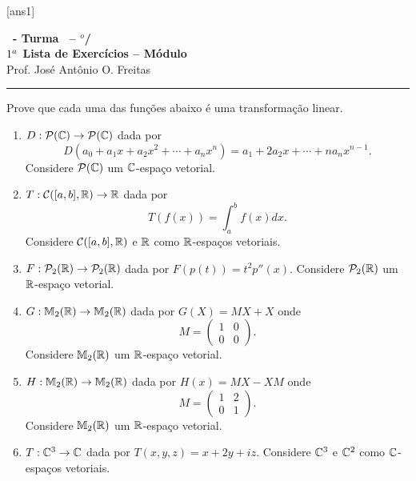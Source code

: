 \documentclass[12pt]{exam}
\begin{document}
  [ans1]
  \begin{center}
    {\Large\bf \disciplina\ - Turma \turma\ -- \semestre$^{o}$/\ano} \\ \vspace{9pt} {\large\bf
        $1^a$ Lista de Exercícios -- Módulo \numeromodulo}\\ \vspace{9pt} Prof. José Antônio O. Freitas
  \end{center}
  \hrule


\begin{exercicio}
  Prove que cada uma das funções abaixo é uma transformação linear.
  \begin{enumerate}[label={\alph*})]
    \item $D : \mathcal{P}(\mathbb{C}) \to \mathcal{P}(\mathbb{C})$ dada por
    \[
        D(a_0 + a_1x + a_2x^2 + \cdots + a_nx^n) = a_1 + 2a_2x + \cdots + na_nx^{n - 1}.
    \]
    Considere $\mathcal{P}(\mathbb{C})$ um $\mathbb{C}$-espaço vetorial.

    \item $T : \mathcal{C}([a,b], \mathbb{R}) \to \mathbb{R}$ dada por
    \[
        T(f(x)) = \int_a^bf(x)dx.
    \]
    Considere $\mathcal{C}([a,b], \mathbb{R})$ e $\mathbb{R}$ como $\mathbb{R}$-espaços vetoriais.

    \item $F : \mathcal{P}_2(\mathbb{R}) \to \mathcal{P}_2(\mathbb{R})$ dada por $F(p(t)) = t^2p''(x)$. Considere $\mathcal{P}_2(\mathbb{R})$ um $\mathbb{R}$-espaço vetorial.

    \item $G : \mathbb{M}_2(\mathbb{R}) \to \mathbb{M}_2(\mathbb{R})$ dada por $G(X) = MX + X$ onde
    \[
        M = \begin{pmatrix}
                1 & 0\\
                0 & 0
            \end{pmatrix}.
    \]
    Considere $\mathbb{M}_2(\mathbb{R})$ um $\mathbb{R}$-espaço vetorial.

    \item $H : \mathbb{M}_2(\mathbb{R}) \to \mathbb{M}_2(\mathbb{R})$ dada por $H(x) = MX - XM$ onde
    \[
        M = \begin{pmatrix}
                1 & 2\\
                0 & 1
            \end{pmatrix}.
    \]
    Considere $\mathbb{M}_2(\mathbb{R})$ um $\mathbb{R}$-espaço vetorial.

    \item $T : \mathbb{C}^3 \to \mathbb{C}$ dada por $T(x,y,z) = x + 2y + iz$. Considere $\mathbb{C}^3$ e $\mathbb{C}^2$ como $\mathbb{C}$-espaços vetoriais.


\end{enumerate}
\end{exercicio}
\end{document}
